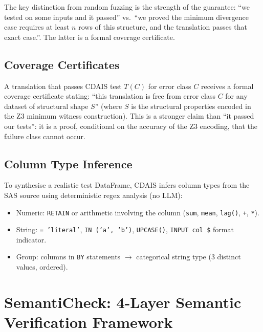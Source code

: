 The key distinction from random fuzzing is the strength of the guarantee:
``we tested on some inputs and it passed'' vs.\ ``we proved the minimum
divergence case requires at least $n$ rows of this structure, and the
translation passes that exact case.''. The latter is a formal coverage
certificate.

\subsection{Coverage Certificates}
\label{subsec:cdais-certificates}

A translation that passes CDAIS test $T(C)$ for error class $C$ receives a
formal coverage certificate stating: ``this translation is free from error
class $C$ for any dataset of structural shape $S$'' (where $S$ is the
structural properties encoded in the Z3 minimum witness construction). This
is a stronger claim than ``it passed our tests'': it is a proof, conditional
on the accuracy of the Z3 encoding, that the failure class cannot occur.

\subsection{Column Type Inference}
\label{subsec:cdais-type-inference}

To synthesise a realistic test DataFrame, CDAIS infers column types from the
SAS source using deterministic regex analysis (no LLM):

\begin{itemize}
  \item Numeric: \texttt{RETAIN} or arithmetic involving the column
    (\texttt{sum}, \texttt{mean}, \texttt{lag()}, \texttt{+}, \texttt{*}).
  \item String: \texttt{= 'literal'}, \texttt{IN ('a', 'b')},
    \texttt{UPCASE()}, \texttt{INPUT col \$} format indicator.
  \item Group: columns in \texttt{BY} statements $\rightarrow$ categorical
    string type (3 distinct values, ordered).
\end{itemize}

\section{SemantiCheck: 4-Layer Semantic Verification Framework}
\label{sec:semanticheck-impl}

